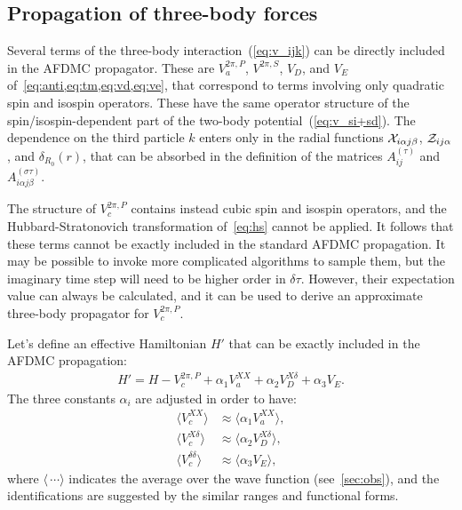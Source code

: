 \documentclass[aps,prc,twocolumn,superscriptaddress,floatfix]{revtex4-1}
\begin{document}
\subsection{Propagation of three-body forces}
\label{sec:p3}
Several terms of the three-body interaction~(\ref{eq:v_ijk}) can be directly included in the AFDMC propagator. 
These are $V_a^{2\pi,P}$, $V^{2\pi,S}$, $V_D$, and $V_E$ of~\cref{eq:anti,eq:tm,eq:vd,eq:ve},
that correspond to terms involving only quadratic spin and isospin operators.
These have the same operator structure of the spin/isospin-dependent part of the
two-body potential~(\ref{eq:v_si+sd}). The dependence on the third particle $k$ enters only in the radial
functions ${\cal X}_{i\alpha j\beta}$, ${\cal Z}_{ij\alpha}$, and $\delta_{R_0}(r)$,
that can be absorbed in the definition of the
matrices $A^{(\tau)}_{ij}$ and $A^{(\sigma\tau)}_{i\alpha j\beta}$.

The structure of $V_c^{2\pi,P}$ contains instead cubic spin and isospin operators, 
and the Hubbard-Stratonovich transformation of~\cref{eq:hs} cannot be applied.
It follows that these terms cannot be exactly included in the standard AFDMC propagation.
It may be possible to invoke more complicated algorithms to sample them, 
but the imaginary time step will need to be higher order in $\delta\tau$.
However, their expectation value can always be calculated, and it can be used to derive
an approximate three-body propagator for $V_c^{2\pi,P}$.

Let's define an effective Hamiltonian $H'$ that can be exactly included in 
the AFDMC propagation:
\begin{align}
H'=H-V_c^{2\pi,P}+\alpha_1 V_a^{XX}+\alpha_2 V_D^{X\delta}+\alpha_3 V_E .
\label{eq:h'}
\end{align}
The three constants $\alpha_i$ are adjusted in order to have:
\begin{align}
\langle V_c^{XX}\rangle & \approx\langle\alpha_1 V_a^{XX}\rangle , \nonumber \\
\langle V_c^{X\delta}\rangle & \approx\langle\alpha_2 V_D^{X\delta}\rangle , \nonumber  \\
\langle V_c^{\delta\delta}\rangle & \approx\langle\alpha_3 V_E\rangle , 
\label{eq:pert}
\end{align}
where $\langle\,\cdots\rangle$ indicates the average over the wave function
(see~\cref{sec:obs}), and the identifications are suggested by the similar 
ranges and functional forms.
\end{document}
